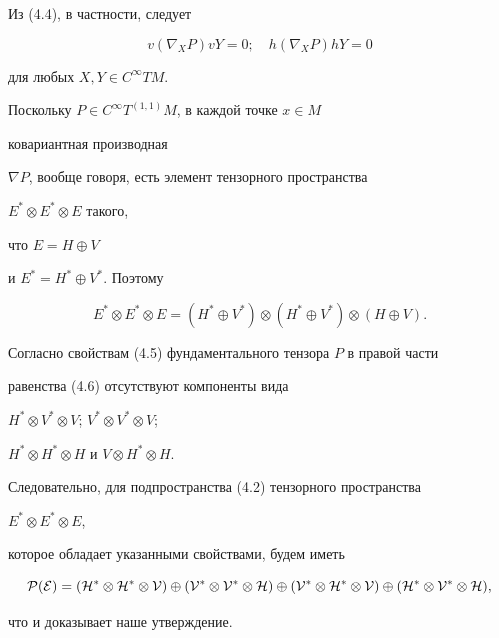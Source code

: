 Из (4.4), в частности, следует 


\begin{equation} 


v(\nabla_X P)vY=0;\quad h(\nabla_X P)hY=0 


\end{equation} 


для любых $X,Y\in C^\infty TM$. 


Поскольку $P\in C^\infty T^{(1,1)}M$, в каждой точке $x\in M$ 


ковариантная производная 


$\nabla P$, вообще говоря, есть элемент тензорного пространства 


$E^*\otimes E^*\otimes E$ такого, 


что $E=H\oplus V$ 


и $E^*=H^*\oplus V^*$. Поэтому 


\begin{equation} 


E^*\otimes E^*\otimes E=(H^*\oplus V^*)\otimes 


(H^*\oplus V^*)\otimes(H\oplus V). 


\end{equation} 


Согласно свойствам (4.5) фундаментального тензора $P$ в правой части 


равенства (4.6) отсутствуют компоненты вида 


$H^*\otimes V^*\otimes V$; $V^*\otimes V^*\otimes V$; 


$H^*\otimes H^*\otimes H$ и $V\otimes H^*\otimes H$. 


Следовательно, для подпространства (4.2) тензорного пространства 


$E^*\otimes E^*\otimes E$, 


которое обладает указанными свойствами, будем иметь 


\begin{equation} 


\cal P(E)=(H^*\otimes H^*\otimes V)\oplus 


(V^*\otimes V^*\otimes H)\oplus 


(V^*\otimes H^*\otimes V)\oplus 


(H^*\otimes V^*\otimes H), 


\end{equation} 


что и доказывает наше утверждение. 


 



